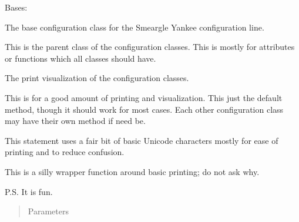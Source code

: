 \documentclass[letterpaper,10pt,english]{sphinxmanual}
\begin{document}
\begin{fulllineitems}
\label{\detokenize{python_docstrings/IfA_Smeargle.yankee.configuration_classes.BaseConfig_file:IfA_Smeargle.yankee.configuration_classes.BaseConfig_file.BaseConfig}}
Bases: 

The base configuration class for the Smeargle Yankee configuration
line.

This is the parent class of the configuration classes. This is mostly for
attributes or functions which all classes should have.

\begin{fulllineitems}
\label{\detokenize{python_docstrings/IfA_Smeargle.yankee.configuration_classes.BaseConfig_file:IfA_Smeargle.yankee.configuration_classes.BaseConfig_file.BaseConfig.__str__}}
The print visualization of the configuration classes.

This is for a good amount of printing and visualization. This just
the default method, though it should work for most cases. Each other
configuration class may have their own method if need be.

This statement uses a fair bit of basic Unicode characters mostly
for ease of printing and to reduce confusion.

\end{fulllineitems}


\begin{fulllineitems}
\label{\detokenize{python_docstrings/IfA_Smeargle.yankee.configuration_classes.BaseConfig_file:IfA_Smeargle.yankee.configuration_classes.BaseConfig_file.BaseConfig.print}}
This is a silly wrapper function around basic printing; do not ask
why.

P.S. It is fun.
\begin{quote}\begin{description}
\item[{Parameters}] \leavevmode
{} \textendash{} 


\end{description}
\end{quote}
\end{fulllineitems}
\end{fulllineitems}
\end{document}

